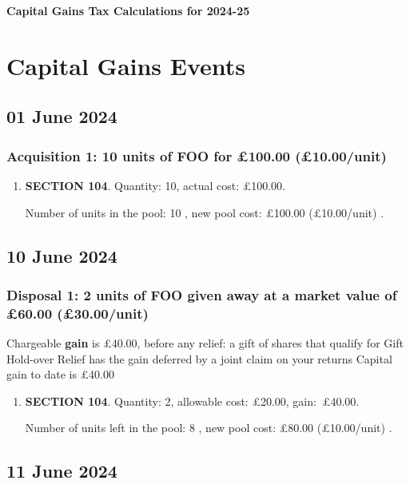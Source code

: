 \documentclass{article}
\begin{document}
\centerline{\Large\bfseries Capital Gains Tax Calculations for 2024-25}

\section*{Capital Gains Events}


\subsection*{01 June 2024}
\subsubsection*{
    Acquisition 1: 10 units of FOO for £100.00
    (£10.00/unit)%
}

\begin{enumerate}
\item \textbf{SECTION 104}. Quantity: 10,
    actual cost: £100.00.

    Number of units in the pool:
    10%
,
    new pool cost: £100.00
    (£10.00/unit)%
.

\end{enumerate}



\subsection*{10 June 2024}
\subsubsection*{
    Disposal 1: 2 units of FOO
given away at a market value of £60.00
    (£30.00/unit)%
}
Chargeable \textbf{gain} is £40.00, before any relief:
a gift of shares that qualify for Gift Hold-over Relief has the gain deferred by a joint claim on your returns
Capital gain to date is £40.00

\begin{enumerate}
\item \textbf{SECTION 104}. Quantity: 2,
    allowable
    cost:
    £20.00,
    \mbox{gain: £40.00.}

    Number of units left in the pool:
    8%
,
    new pool cost: £80.00
    (£10.00/unit)%
.

\end{enumerate}



\subsection*{11 June 2024}
\end{document}
